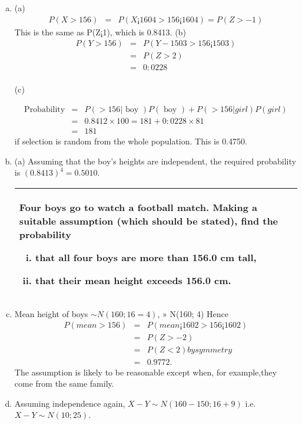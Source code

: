 \documentclass[a4paper,12pt]{article}
\begin{document}
\begin{enumerate}[(a)]

\item (a) 
\begin{eqnarray*}
P(X > 156) &=& P(X¡160
4 > 156¡160
4 ) = P(Z > - 1)
\end{eqnarray*}
This is the same as P(Z¡1), which is 0.8413.
(b) 
\begin{eqnarray*}
  P(Y > 156) &=& P(Y - 150
3 > 156¡150
3 ) \\ &=& P(Z > 2)\\ &=& 0:0228  \\
\end{eqnarray*}

(c)

\begin{eqnarray*}
\mbox{Probability} &=&P(> 156|\mbox{ boy })P(\mbox{ boy }) + P(> 156|girl)P(girl)\\ &=& 0.8412 \times 100=181 +
0:0228 \times 81 \\&=&181
\end{eqnarray*} if selection is random from the whole population. This is 0.4750.
\item (a) Assuming that the boy’s heights are independent, the required probability is $(0.8413)^4 =  0.5010$.
\newpage
  \begin{table}[ht!]
  \centering
  \begin{tabular}{|p{15cm}|}
  \hline
Four boys go to watch a football match.  Making a suitable assumption (which should be stated), find the probability 
\begin{enumerate}[(i)] 
\item that all four boys are more than 156.0 cm tall,  
\item that their mean height exceeds 156.0 cm.   
\end{enumerate}
\\
  \hline
    \end{tabular}
 \end{table}
\item Mean height of boys $\sim N(160; 16=4)$, » N(160; 4)
Hence 
\begin{eqnarray*}
P(mean > 156) &=& P(mean¡160
2 > 156¡160
2 ) \\ &=& P(Z > - 2) \\ &=& P(Z < 2) by
symmetry\\ &=& 0.9772.
\end{eqnarray*}
The assumption is likely to be reasonable except when, for example,they come from
the same family.
\item Assuming independence again, $X -  Y \sim N(160 -  150; 16 + 9)$ i.e. $X -  Y \sim  N(10; 25)$.


\end{enumerate}
\end{document}
